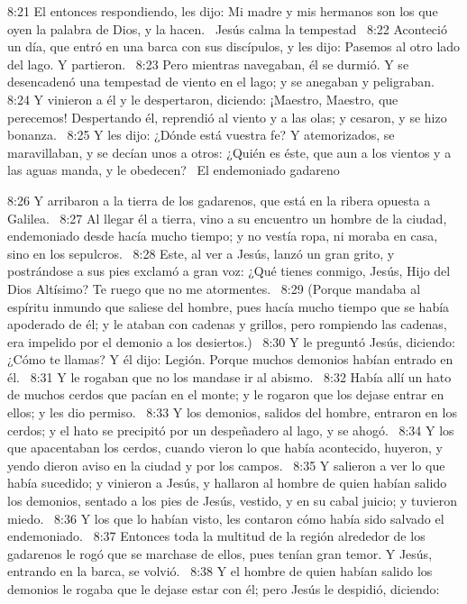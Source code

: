8:21 El entonces respondiendo, les dijo: Mi madre y mis hermanos son los que oyen la palabra de Dios, y la hacen.  
Jesús calma la tempestad   
8:22 Aconteció un día, que entró en una barca con sus discípulos, y les dijo: Pasemos al otro lado del lago. Y partieron.  
8:23 Pero mientras navegaban, él se durmió. Y se desencadenó una tempestad de viento en el lago; y se anegaban y peligraban.  
8:24 Y vinieron a él y le despertaron, diciendo: ¡Maestro, Maestro, que perecemos! Despertando él, reprendió al viento y a las olas; y cesaron, y se hizo bonanza.  
8:25 Y les dijo: ¿Dónde está vuestra fe? Y atemorizados, se maravillaban, y se decían unos a otros: ¿Quién es éste, que aun a los vientos y a las aguas manda, y le obedecen?  
El endemoniado gadareno  

8:26 Y arribaron a la tierra de los gadarenos, que está en la ribera opuesta a Galilea.  
8:27 Al llegar él a tierra, vino a su encuentro un hombre de la ciudad, endemoniado desde hacía mucho tiempo; y no vestía ropa, ni moraba en casa, sino en los sepulcros.  
8:28 Este, al ver a Jesús, lanzó un gran grito, y postrándose a sus pies exclamó a gran voz: ¿Qué tienes conmigo, Jesús, Hijo del Dios Altísimo? Te ruego que no me atormentes.  
8:29 (Porque mandaba al espíritu inmundo que saliese del hombre, pues hacía mucho tiempo que se había apoderado de él; y le ataban con cadenas y grillos, pero rompiendo las cadenas, era impelido por el demonio a los desiertos.)  
8:30 Y le preguntó Jesús, diciendo: ¿Cómo te llamas? Y él dijo: Legión. Porque muchos demonios habían entrado en él.  
8:31 Y le rogaban que no los mandase ir al abismo.  
8:32 Había allí un hato de muchos cerdos que pacían en el monte; y le rogaron que los dejase entrar en ellos; y les dio permiso.  
8:33 Y los demonios, salidos del hombre, entraron en los cerdos; y el hato se precipitó por un despeñadero al lago, y se ahogó.  
8:34 Y los que apacentaban los cerdos, cuando vieron lo que había acontecido, huyeron, y yendo dieron aviso en la ciudad y por los campos.  
8:35 Y salieron a ver lo que había sucedido; y vinieron a Jesús, y hallaron al hombre de quien habían salido los demonios, sentado a los pies de Jesús, vestido, y en su cabal juicio; y tuvieron miedo.  
8:36 Y los que lo habían visto, les contaron cómo había sido salvado el endemoniado.  
8:37 Entonces toda la multitud de la región alrededor de los gadarenos le rogó que se marchase de ellos, pues tenían gran temor. Y Jesús, entrando en la barca, se volvió.  
8:38 Y el hombre de quien habían salido los demonios le rogaba que le dejase estar con él; pero Jesús le despidió, diciendo:  
